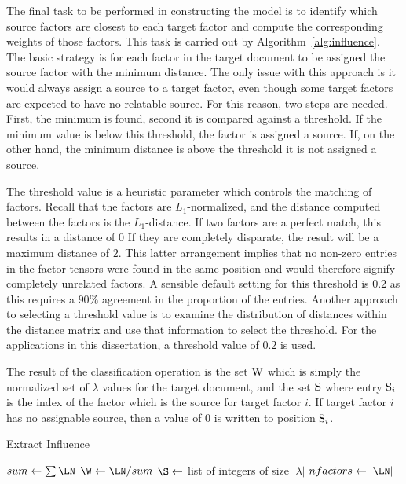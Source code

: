 \documentclass[../ut-dissertation.tex]{subfiles}
\begin{document}
The final task to be performed in constructing the model is to
identify which source factors are closest to each target factor and
compute the corresponding weights of those factors.  This task is
carried out by Algorithm~\ref{alg:influence}.  The basic strategy is
for each factor in the target document to be assigned the source
factor with the minimum distance.  The only issue with this approach
is it would always assign a source to a target factor, even though
some target factors are expected to have no relatable source.  For
this reason, two steps are needed.  First, the minimum is found,
second it is compared against a threshold.  If the minimum value is
below this threshold, the factor is assigned a source.  If, on the
other hand, the minimum distance is above the threshold it is not
assigned a source.

The threshold value is a heuristic parameter which controls the
matching of factors. Recall that the factors are $L_1$-normalized, and
the distance computed between the factors is the $L_1$-distance. If
two factors are a perfect match, this results in a distance of $0$
If they are completely disparate, the result will be a maximum
distance of $2$.  This latter arrangement implies that no non-zero
entries in the factor tensors were found in the same position and
would therefore signify completely unrelated factors.  A sensible
default setting for this threshold is $0.2$ as this requires a $90\%$
agreement in the proportion of the entries.  Another approach to
selecting a threshold value is to examine the distribution of
distances within the distance matrix and use that information to
select the threshold.  For the applications in this dissertation, a
threshold value of $0.2$ is used.

The result of the classification operation is the set $\mathrm{W}$ which
is simply the normalized set of $\lambda$ values for the target
document, and the set $\mathrm{S}$ where entry $\mathrm{S}_i$ is the index
of the factor which is the source for target factor $i$.  If target
factor $i$ has no assignable source, then a value of 0 is written to
position $\mathrm{S}_i$.
\begin{algorithm}
  \caption{Extract Influence}
  \label{alg:influence}
   
   
  
  \Output{\W, \S}
  \BlankLine
  $sum \leftarrow \sum \LN$\;
  $\W \leftarrow \LN / sum$\;
  $\S \leftarrow$ list of integers of size $|\lambda|$\;
  $nfactors \leftarrow |\LN|$\;
  \Return{\W, \S}\;
\end{algorithm}
\end{document}
